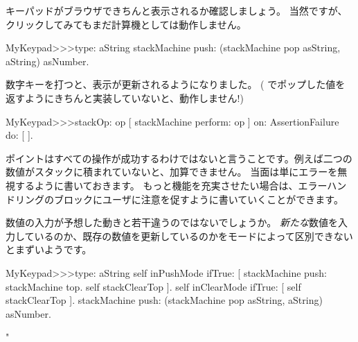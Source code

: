 \documentclass[a4paper,10pt,twoside]{book}
\begin{document}
キーパッドがブラウザできちんと表示されるか確認しましょう。
当然ですが、クリックしてみてもまだ計算機としては動作しません。

\begin{code}{}
MyKeypad>>>type: aString
	stackMachine push: (stackMachine pop asString, aString) asNumber.
\end{code}
数字キーを打つと、表示が更新されるようになりました。
( でポップした値を返すようにきちんと実装していないと、動作しません!)



\begin{code}{}
MyKeypad>>>stackOp: op
	[ stackMachine perform: op ] on: AssertionFailure do: [ ].
\end{code}

ポイントはすべての操作が成功するわけではないと言うことです。例えば二つの数値がスタックに積まれていないと、加算できません。
当面は単にエラーを無視するように書いておきます。
もっと機能を充実させたい場合は、エラーハンドリングのブロックにユーザに注意を促すように書いていくことができます。


数値の入力が予想した動きと若干違うのではないでしょうか。
\emph{新たな}数値を入力しているのか、既存の数値を更新しているのかをモードによって区別できないとまずいようです。



\begin{code}{}
MyKeypad>>>type: aString
	self inPushMode ifTrue: [
		stackMachine push: stackMachine top.
		self stackClearTop ].
	self inClearMode ifTrue: [ self stackClearTop ].
	stackMachine push: (stackMachine pop asString, aString) asNumber.
\end{code}
"
\end{document}
